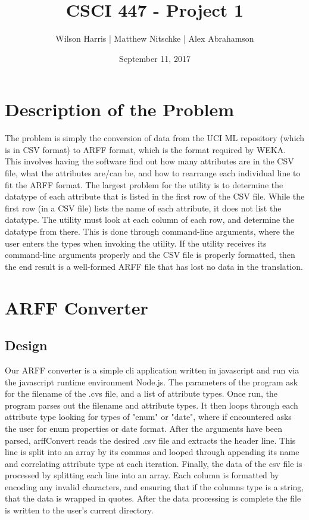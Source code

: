 \documentclass[11pt]{article} %
\title{\textbf{CSCI 447 - Project 1}}
\author{Wilson Harris | Matthew Nitschke | Alex Abrahamson }
\date{September 11, 2017}
\begin{document}
\maketitle

\section{Description of the Problem}
The problem is simply the conversion of data from the UCI ML repository (which is in CSV format) to ARFF format, which is the format required by WEKA. This involves having the software find out how many attributes are in the CSV file, what the attributes are/can be, and how to rearrange each individual line to fit the ARFF format. The largest problem for the utility is to determine the datatype of each attribute that is listed in the first row of the CSV file. While the first row (in a CSV file) lists the name of each attribute, it does not list the datatype. The utility must look at each column of each row, and determine the datatype from there. This is done through command-line arguments, where the user enters the types when invoking the utility. If the utility receives its command-line arguments properly and the CSV file is properly formatted, then the end result is a well-formed ARFF file that has lost no data in the translation.

\section{ARFF Converter}

\subsection{Design}
Our ARFF converter is a simple cli application written in javascript and run via the javascript runtime environment Node.js. The parameters of the program ask for the filename of the .cvs file, and a list of attribute types. Once run, the program parses out the filename and attribute types. It then loops through each attribute type looking for types of "enum" or "date", where if encountered asks the user for enum properties or date format. After the arguments have been parsed, arffConvert reads the desired .csv file and extracts the header line. This line is split into an array by its commas and looped through appending its name and correlating attribute type at each iteration. Finally, the data of the csv file is processed by splitting each line into an array. Each column is formatted by encoding any invalid characters, and ensuring that if the columns type is a string, that the data is wrapped in quotes. After the data processing is complete the file is written to the user's current directory.
\end{document}
